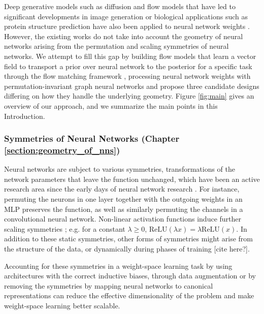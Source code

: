 Deep generative models such as diffusion and flow models that have led to significant developments in image generation \citep{esserScalingRectifiedFlow2024b} or biological applications such as protein structure prediction \citep{abramsonAccurateStructurePrediction2024} have also been applied to neural network weights \citep{peeblesLearningLearnGenerative2022,schurholtHyperRepresentationsLearningPopulations2024a}. However, the existing works do not take into account the geometry of neural networks arising from the permutation and scaling symmetries of neural networks. We attempt to fill this gap by building flow models that learn a vector field to transport a prior over neural network to the posterior for a specific task through the flow matching framework \citep{lipmanFlowMatchingGuide2024}, processing neural network weights with permutation-invariant graph neural networks \citep{kofinasGraphNeuralNetworks2024,limGraphMetanetworksProcessing2023} and propose three candidate designs differing on how they handle the underlying geometry. Figure \ref{fig:main} gives an overview of our approach, and we summarize the main points in this Introduction. 

\subsubsection{Symmetries of Neural Networks (Chapter \ref{section:geometry_of_nns})}

Neural networks are subject to various symmetries, transformations of the network parameters that leave the function unchanged, which have been an active research area since the early days of neural network research \citep{hecht-nielsenALGEBRAICSTRUCTUREFEEDFORWARD1990}. For instance, permuting the neurons in one layer together with the outgoing weights in an MLP preserves the function, as well as similarly permuting the channels in a convolutional neural network. Non-linear activation functions induce further scaling symmetries \citep{godfreySymmetriesDeepLearning2022}; e.g. for a constant $\lambda \geq 0$, $\text{ReLU}(\lambda x) = \lambda \text{ReLU}(x)$. In addition to these static symmetries, other forms of symmetries might arise from the structure of the data, or dynamically during phases of training {\color{red} [cite here?]}. 

Accounting for these symmetries in a weight-space learning task by using architectures with the correct inductive biases, through data augmentation \citep{shamsianImprovedGeneralizationWeight2024} or by removing the symmetries by mapping neural networks to canonical representations \citep{pittorinoDeepNetworksToroids2022} can reduce the effective dimensionality of the problem and make weight-space learning better scalable.  

